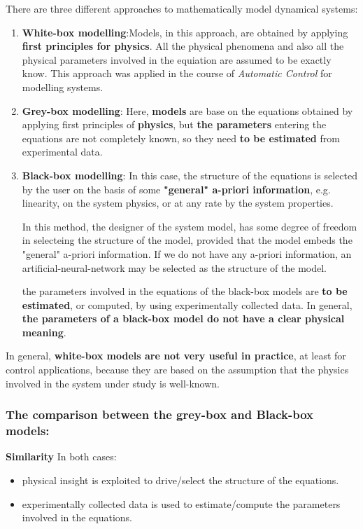 There are three different approaches to mathematically model dynamical systems:
\begin{enumerate}

\item \textbf{White-box modelling}:\newline Models, in this approach, are obtained by applying \textbf{first principles for physics}. All the physical phenomena and also all the physical parameters involved in the equiation are assumed to be exactly know. This approach was applied in the course of \textit{Automatic Control} for modelling systems.

\item \textbf{Grey-box modelling}: Here, \textbf{models} are base on the equations obtained by applying first principles of \textbf{physics}, but \textbf{the parameters} entering the equations are not completely known, so they need \textbf{to be estimated} from experimental data. 

\item \textbf{Black-box modelling}: In this case, the structure of the equations is selected by the user on the basis of some \textbf{"general" a-priori information}, e.g. linearity, on the system physics, or at any rate by the system properties. \newline 

\begin{factbox}
    In this method, the designer of the system model, has some degree of freedom in selecteing the structure of the model, provided that the model embeds the "general" a-priori information.\newline \newline
    If we do not have any a-priori information, an artificial-neural-network may be selected as the structure of the model.
\end{factbox}
the parameters involved in the equations of the black-box models are \textbf{to be estimated}, or computed, by using experimentally collected data. In general, \textbf{the parameters of a black-box model do not have a clear physical meaning}.
\end{enumerate}


In general, \textbf{white-box models are not very useful in practice}, at least for control applications, because they are based on the assumption that the physics involved in the system under study is well-known.

\subsubsection{The comparison between the grey-box and Black-box models:}
\textbf{Similarity} 
In both cases:
\begin{itemize}
\item physical insight is exploited to drive/select the structure of the equations.
\item experimentally collected data is used to estimate/compute the parameters involved in the equations.
\end{itemize}

